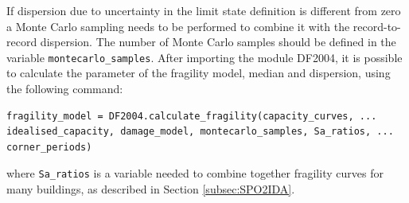 If dispersion due to uncertainty in the limit state definition is different from zero a Monte Carlo sampling needs to be performed to combine it with the record-to-record dispersion. The number of Monte Carlo samples should be defined in the variable \verb=montecarlo_samples=.
After importing the module DF2004, it is possible to calculate the parameter of the fragility model, median and dispersion, using the following command:

\begin{Verbatim}[frame=single, commandchars=\\\{\}, samepage=true]
fragility_model = DF2004.calculate_fragility(capacity_curves, ...
idealised_capacity, damage_model, montecarlo_samples, Sa_ratios, ...
corner_periods)
\end{Verbatim}

where \verb=Sa_ratios= is a variable needed to combine together fragility curves for many buildings, as described in Section \ref{subsec:SPO2IDA}.